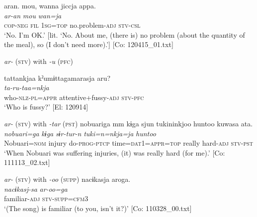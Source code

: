 \ex \label{ex:9.45d} %
 \glll  aran.  {\textbar}mou{\textbar},  wanna  jiccja  appa.\\
      \textit{ar-an}  \textit{mou}  \textit{wan=ja}  \textit{}  \textit{}\\
      \textsc{cop}-\textsc{neg}  \textsc{fil}  1\textsc{sg}=\textsc{top}  no.problem-\textsc{adj}  \textsc{stv}-\textsc{csl}\\
      \glt       ‘No. I’m OK.’ [lit. ‘No. About me, (there is) no problem (about the quantity of the meal), so (I don’t need more).’] [Co: 120415\_01.txt]

\exi{} \textit{ar-} (\textsc{stv}) with \textit{{}-u} (\textsc{pfc})

\ex \label{ex:9.45e} %
 \glll  tattankjaa  kˀumɨttagamarasja  aru?\\
      \textit{ta-ru-taa=nkja}  \textit{}  \textit{}\\
      who-\textsc{nlz}-\textsc{pl}=\textsc{appr}  attentive+fussy-\textsc{adj}  \textsc{stv}-\textsc{pfc}\\
      \glt       ‘Who is fussy?’ [El: 120914]

\exi{}  \textit{ar-} (\textsc{stv}) with \textit{{}-tar} (\textsc{pst})
\ex
\glll   nobuariga  mm  kɨga  sjun  tukininkjoo  huntoo  kuwasa  ata.\\
      \textit{nobuari=ga}    \textit{kɨga}  \textit{sɨr-tur-n}  \textit{tuki=n=nkja=ja}  \textit{huntoo}  \textit{}  \textit{}\\
      Nobuari=\textsc{nom}    injury  do-\textsc{prog}-\textsc{ptcp}  time=\textsc{dat}1=\textsc{appr}=\textsc{top}  really  hard-\textsc{adj}  \textsc{stv}-\textsc{pst}\\
      \glt       ‘When Nobuari was suffering injuries, (it) was really hard (for me).’ [Co: 111113\_02.txt]

\exi{}  \textit{ar-} (\textsc{stv}) with \textit{{}-oo} (\textsc{supp})
\ex
\glll     nacɨkasja  aroga.\footnotemark\\
      \textit{nacɨkasj-sa}  \textit{ar-oo=ga}\\
      familiar-\textsc{adj}  \textsc{stv}-\textsc{supp}=\textsc{cfm}3\\
      \glt       ‘(The song) is familiar (to you, isn’t it?)’ [Co: 110328\_00.txt]
    \z
\z{}

